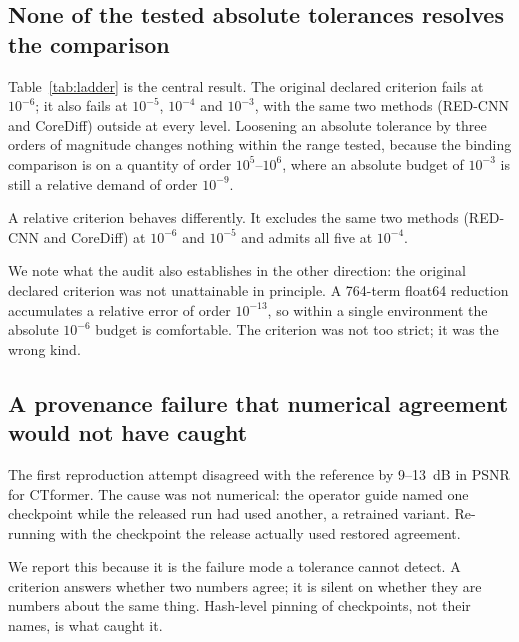 \documentclass[11pt]{article}
\begin{document}
\subsection{None of the tested absolute tolerances resolves the comparison}

Table~\ref{tab:ladder} is the central result. The original declared criterion fails at $10^{-6}$; it
also fails at $10^{-5}$, $10^{-4}$ and $10^{-3}$, with the same two methods (RED-CNN and CoreDiff)
outside at every level. Loosening an absolute tolerance by three orders of magnitude changes nothing
within the range tested, because the
binding comparison is on a quantity of order $10^{5}$--$10^{6}$, where an absolute budget of
$10^{-3}$ is still a relative demand of order $10^{-9}$.

A relative criterion behaves differently. It excludes the same two methods (RED-CNN and CoreDiff)
at $10^{-6}$ and $10^{-5}$ and admits all five at $10^{-4}$.

\begin{table}[ht]
\centering

\caption{\textbf{The criterion ladder.} Applied to the same recorded differences, with no
measurement changed. None of the absolute criteria tested is repaired by loosening it; only
changing its kind resolved the comparison among the criteria tested.}
\label{tab:ladder}
\end{table}

We note what the audit also establishes in the other direction: the original declared criterion was not
unattainable in principle. A 764-term float64 reduction accumulates a relative error of order
$10^{-13}$, so within a single environment the absolute $10^{-6}$ budget is comfortable. The
criterion was not too strict; it was the wrong kind.

\subsection{A provenance failure that numerical agreement would not have caught}

The first reproduction attempt disagreed with the reference by 9--13~dB in PSNR for CTformer. The
cause was not numerical: the operator guide named one checkpoint while the released run had used
another, a retrained variant. Re-running with the checkpoint the release actually used restored
agreement.

We report this because it is the failure mode a tolerance cannot detect. A criterion answers whether
two numbers agree; it is silent on whether they are numbers about the same thing. Hash-level
pinning of checkpoints, not their names, is what caught it.
\end{document}
